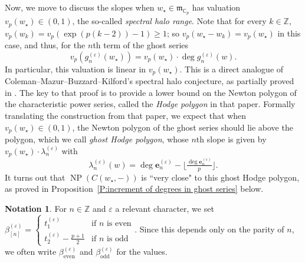 \documentclass[12pt]{amsart}
\theoremstyle{definition}
\newtheorem{notation}[subsection]{Notation}
\numberwithin{equation}{subsection}
\def\gothm{\mathfrak{m}}
\def\CC{\mathbb{C}}
\def\ZZ{\mathbb{Z}}
\def\bfe{\mathbf{e}}
\DeclareMathOperator{\NP}{NP}
\newcommand{\even}{\mathrm{even}}
\newcommand{\odd}{\mathrm{odd}}
\begin{document}
Now, we move to discuss the slopes when $w_\star \in \gothm_{\CC_p}$ has valuation $v_p(w_\star) \in (0,1)$, the so-called \emph{spectral halo range}. Note that for every $k \in \ZZ$, $v_p(w_k) = v_p(\exp(p(k-2))-1) \geq 1$; so $v_p(w_\star- w_k) = v_p(w_\star)$ in this case, and thus, for the $n$th term of the ghost series
$$
v_p(g_n^{(\varepsilon)}(w_\star)) =  v_p(w_\star) \cdot \deg g_n^{(\varepsilon)}(w).
$$
In particular, this valuation is linear in $v_p(w_\star)$. 
This is a direct analogue of Coleman--Mazur--Buzzard--Kilford's spectral halo conjecture, as partially proved in \cite{liu-wan-xiao}. The key to that proof is to provide a lower bound on the Newton polygon of the  characteristic power series, called the \emph{Hodge polygon} in that paper.
Formally translating the construction from that paper, we expect that when $v_p(w_\star) \in (0,1)$, the Newton polygon of the ghost series should lie above the polygon, which we call \emph{ghost Hodge polygon}, whose $n$th slope is given by $v_p(w_\star) \cdot \lambda_n^{(\varepsilon)}$ with  $$\lambda_n^{(\varepsilon)}(w)= \deg \bfe_n^{(\varepsilon)} - \big\lfloor \tfrac{\deg \bfe_n^{(\varepsilon)}}p\big\rfloor.$$
It turns out that $\NP(C(w_\star, -))$ is ``very close" to this ghost Hodge polygon, as proved in Proposition~\ref{P:increment of degrees in ghost series} below.

\begin{notation}
\label{N:tnvarepsilon}
For $n \in \ZZ$ and $\varepsilon$ a relevant character, we set
$\beta_{[n]}^{(\varepsilon)} = \begin{cases}
t_1^{(\varepsilon)} & \textrm{if }n \textrm{ is even}
\\
t_2^{(\varepsilon)}-
\tfrac{p+1}2 & \textrm{if }n \textrm{ is odd}
\end{cases}$.
Since this depends only on the parity of $n$, we often write $\beta_\even^{(\varepsilon)}$ and $\beta_\odd^{(\varepsilon)}$ for the values.
\end{notation}
\end{document}
